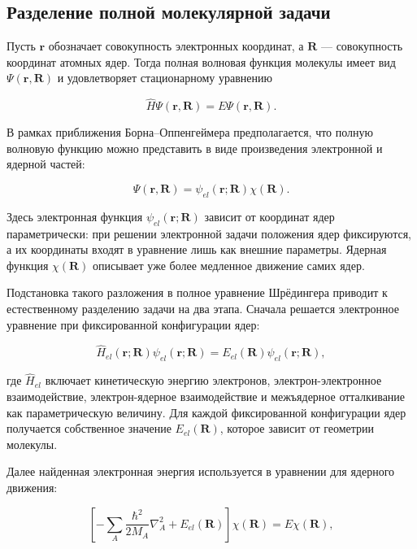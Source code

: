 \subsection{Разделение полной молекулярной задачи}

Пусть $\mathbf{r}$ обозначает совокупность электронных координат,
а $\mathbf{R}$ --- совокупность координат атомных ядер.
Тогда полная волновая функция молекулы имеет вид
$\Psi(\mathbf{r},\mathbf{R})$ и удовлетворяет стационарному уравнению

\begin{equation}
\hat{H}\Psi(\mathbf{r},\mathbf{R})=E\Psi(\mathbf{r},\mathbf{R}).
\end{equation}

В рамках приближения Борна--Оппенгеймера предполагается, что полную
волновую функцию можно представить в виде произведения электронной
и ядерной частей:

\begin{equation}
\Psi(\mathbf{r},\mathbf{R})
=
\psi_{el}(\mathbf{r};\mathbf{R})\chi(\mathbf{R}).
\end{equation}

Здесь электронная функция $\psi_{el}(\mathbf{r};\mathbf{R})$
зависит от координат ядер параметрически:
при решении электронной задачи положения ядер фиксируются,
а их координаты входят в уравнение лишь как внешние параметры.
Ядерная функция $\chi(\mathbf{R})$ описывает уже более медленное
движение самих ядер.

Подстановка такого разложения в полное уравнение Шрёдингера приводит
к естественному разделению задачи на два этапа.
Сначала решается электронное уравнение при фиксированной конфигурации ядер:

\begin{equation}
\hat{H}_{el}(\mathbf{r};\mathbf{R})
\psi_{el}(\mathbf{r};\mathbf{R})
=
E_{el}(\mathbf{R})\psi_{el}(\mathbf{r};\mathbf{R}),
\end{equation}

где $\hat{H}_{el}$ включает кинетическую энергию электронов,
электрон-электронное взаимодействие, электрон-ядерное взаимодействие
и межъядерное отталкивание как параметрическую величину.
Для каждой фиксированной конфигурации ядер получается собственное
значение $E_{el}(\mathbf{R})$, которое зависит от геометрии молекулы.

Далее найденная электронная энергия используется в уравнении
для ядерного движения:

\begin{equation}
\left[
-\sum_A\frac{\hbar^2}{2M_A}\nabla_A^2
+E_{el}(\mathbf{R})
\right]\chi(\mathbf{R})
=
E\chi(\mathbf{R}),
\end{equation}

